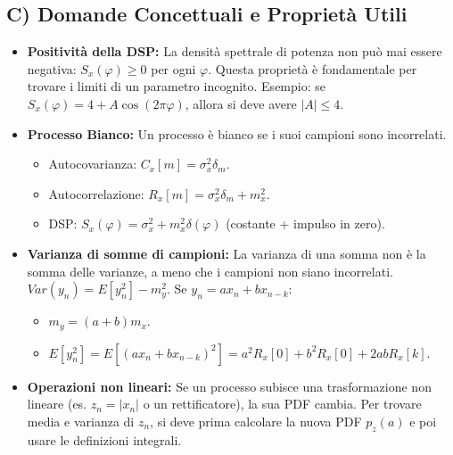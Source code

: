 \subsection{C) Domande Concettuali e Proprietà Utili}
\begin{itemize}
    \item \textbf{Positività della DSP:} La densità spettrale di potenza non può mai essere negativa: $S_x(\varphi) \ge 0$ per ogni $\varphi$. Questa proprietà è fondamentale per trovare i limiti di un parametro incognito.
    Esempio: se $S_x(\varphi) = 4 + A\cos(2\pi \varphi)$, allora si deve avere $|A| \le 4$.
    
    \item \textbf{Processo Bianco:} Un processo è bianco se i suoi campioni sono incorrelati.
    \begin{itemize}
        \item Autocovarianza: $C_x[m] = \sigma_x^2 \delta_m$.
        \item Autocorrelazione: $R_x[m] = \sigma_x^2 \delta_m + m_x^2$.
        \item DSP: $S_x(\varphi) = \sigma_x^2 + m_x^2 \delta(\varphi)$ (costante + impulso in zero).
    \end{itemize}
    
    \item \textbf{Varianza di somme di campioni:} La varianza di una somma non è la somma delle varianze, a meno che i campioni non siano incorrelati.
    $ Var(y_n) = E[y_n^2] - m_y^2 $. Se $y_n = ax_n + bx_{n-k}$:
    \begin{itemize}
        \item $m_y = (a+b)m_x$.
        \item $E[y_n^2] = E[(ax_n + bx_{n-k})^2] = a^2R_x[0] + b^2R_x[0] + 2abR_x[k]$.
    \end{itemize}

    \item \textbf{Operazioni non lineari:} Se un processo subisce una trasformazione non lineare (es. $z_n = |x_n|$ o un rettificatore), la sua PDF cambia. Per trovare media e varianza di $z_n$, si deve prima calcolare la nuova PDF $p_z(a)$ e poi usare le definizioni integrali.
\end{itemize}
